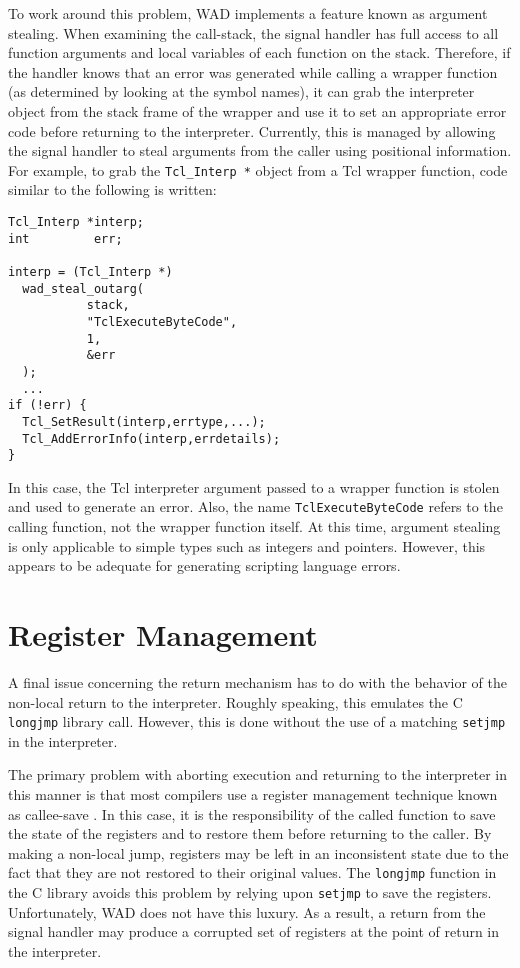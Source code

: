 To work around this problem, WAD implements a feature
known as argument stealing.  When examining the call-stack, the signal
handler has full access to all function arguments and local variables of each function
on the stack.
Therefore, if the handler knows that an error was generated while
calling a wrapper function (as determined by looking at the symbol names),
it can grab the interpreter object from the stack frame of the wrapper and
use it to set an appropriate error code before returning to the interpreter.
Currently, this is managed by allowing the signal handler to steal
arguments from the caller using positional information.
For example, to grab the {\tt Tcl\_Interp *} object from a Tcl wrapper function,
code similar to the following is written:

\begin{verbatim}
Tcl_Interp *interp;
int         err;

interp = (Tcl_Interp *)
  wad_steal_outarg(
           stack,                
           "TclExecuteByteCode",
           1,
           &err
  );
  ...
if (!err) {
  Tcl_SetResult(interp,errtype,...);
  Tcl_AddErrorInfo(interp,errdetails);
}
\end{verbatim}

In this case, the Tcl interpreter argument passed to a wrapper function 
is stolen and used to generate an error.  Also, the name {\tt TclExecuteByteCode}
refers to the calling function, not the wrapper function itself.
At this time, argument stealing is only applicable to simple types
such as integers and pointers.  However, this appears to be adequate for generating
scripting language errors.

\section{Register Management}

A final issue concerning the return mechanism has to do with the
behavior of the non-local return to the interpreter.  Roughly
speaking, this emulates the C {\tt longjmp}
library call.  However, this is done without the use of a matching
{\tt setjmp} in the interpreter.  

The primary problem with aborting execution and returning to the
interpreter in this manner is that most compilers use a register
management technique known as callee-save \cite{prag}.  In this case,
it is the responsibility of the called function to save the state of
the registers and to restore them before returning to the caller. By
making a non-local jump, registers may be left in an inconsistent
state due to the fact that they are not restored to their original
values.  The {\tt longjmp} function in the C library avoids this
problem by relying upon {\tt setjmp} to save the registers.  Unfortunately,
WAD does not have this luxury.   As a result, a return from the signal
handler may produce a corrupted set of registers at the point of return
in the interpreter.

